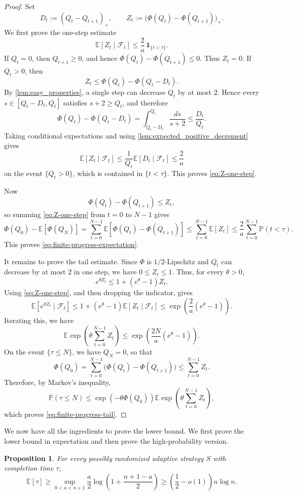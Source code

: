 \documentclass[11pt,reqno,letterpaper]{amsart}
\newtheorem{proposition}[theorem]{Proposition}
\theoremstyle{definition}
\numberwithin{equation}{section}
\newcommand{\E}{\mathbb{E}}
\renewcommand{\P}{\mathbb{P}}
\newcommand{\mc}{\mathcal}
\newcommand{\mbf}{\mathbf}
\begin{document}
\begin{proof}
Set
\[
D_t:=(Q_t-Q_{t+1})_+,
\qquad
Z_t:=\bigl(\Phi(Q_t)-\Phi(Q_{t+1})\bigr)_+.
\]
We first prove the one-step estimate
\begin{equation}\label{eq:Z-one-step}
\E[Z_t\mid \mc F_t]\le \frac2a\,\mbf1_{\{t<\tau\}}.
\end{equation}
If \(Q_t=0\), then \(Q_{t+1}\ge0\), and hence
\(\Phi(Q_t)-\Phi(Q_{t+1})\le0\). Thus \(Z_t=0\). If \(Q_t>0\), then
\[
Z_t
\le
\Phi(Q_t)-\Phi(Q_t-D_t).
\]
By \cref{lem:easy_properties}, a single step can decrease \(Q_t\) by at most \(2\).  Hence every
\(s\in[Q_t-D_t,Q_t]\) satisfies \(s+2\ge Q_t\), and therefore
\[
\Phi(Q_t)-\Phi(Q_t-D_t)
=
\int_{Q_t-D_t}^{Q_t}\frac{ds}{s+2}
\le
\frac{D_t}{Q_t}.
\]
Taking conditional expectations and using \cref{lem:expected_positive_decrement} gives
\[
\E[Z_t\mid \mc F_t]
\le
\frac1{Q_t}\E[D_t\mid \mc F_t]
\le
\frac2a
\]
on the event \(\{Q_t>0\}\), which is contained in \(\{t<\tau\}\).  This proves \eqref{eq:Z-one-step}.

Now
\[
\Phi(Q_t)-\Phi(Q_{t+1})\le Z_t,
\]
so summing \eqref{eq:Z-one-step} from \(t=0\) to \(N-1\) gives
\[
\Phi(Q_0)-\E[\Phi(Q_N)]
=
\sum_{t=0}^{N-1}\E[\Phi(Q_t)-\Phi(Q_{t+1})]
\le
\sum_{t=0}^{N-1}\E[Z_t]
\le
\frac2a\sum_{t=0}^{N-1}\P(t<\tau).
\]
This proves \eqref{eq:finite-progress-expectation}.

It remains to prove the tail estimate.  Since \(\Phi\) is \(1/2\)-Lipschitz and \(Q_t\)
can decrease by at most \(2\) in one step, we have \(0\le Z_t\le1\).  Thus, for every
\(\theta>0\),
\[
e^{\theta Z_t}\le 1+(e^\theta-1)Z_t.
\]
Using \eqref{eq:Z-one-step}, and then dropping the indicator, gives
\[
\E[e^{\theta Z_t}\mid \mc F_t]
\le
1+(e^\theta-1)\E[Z_t\mid \mc F_t]
\le
\exp\left(\frac2a(e^\theta-1)\right).
\]
Iterating this, we have
\[
\E\exp\left(\theta\sum_{t=0}^{N-1}Z_t\right)
\le
\exp\left(\frac{2N}{a}(e^\theta-1)\right).
\]
On the event \(\{\tau\le N\}\), we have \(Q_N=0\), so that
\[
\Phi(Q_0)
=
\sum_{t=0}^{N-1}\bigl(\Phi(Q_t)-\Phi(Q_{t+1})\bigr)
\le
\sum_{t=0}^{N-1}Z_t.
\]
Therefore, by Markov's inequality, \[
\P(\tau\le N)
\le
\exp(-\theta\Phi(Q_0))
\E\exp\left(\theta\sum_{t=0}^{N-1}Z_t\right),
\]
which proves \eqref{eq:finite-progress-tail}.
\end{proof}

We now have all the ingredients to prove the lower bound. We first prove the lower bound in expectation and then prove the high-probability version.

\begin{proposition}\label{prop:lower}
For every possibly randomized adaptive strategy \(S\) with completion time \(\tau\),
\begin{equation}
\label{eq:lower-bound-sup-version}
\E[\tau]
\ge
\sup_{0<a<n+1}
\frac a2
\log\left(1+\frac{n+1-a}{2}\right) \geq \left(\frac12- o(1)\right)n\log n.
\end{equation}
\end{proposition}
\end{document}
